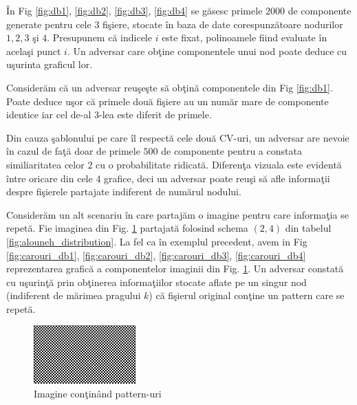 \documentclass{llncs}
\begin{document}
\^{I}n Fig {\ref{fig:db1}}, {\ref{fig:db2}}, {\ref{fig:db3}}, {\ref{fig:db4}} se g\u{a}sesc primele $2000$ de componente generate pentru cele $3$ fi\c{s}iere, stocate \^{i}n baza de date corespunz\u{a}toare nodurilor $1,2,3$ \c{s}i $4$. Presupunem c\u{a} indicele $i$ este fixat, polinoamele fiind evaluate \^{i}n acela\c{s}i punct $i$. Un adversar care ob\c{t}ine componentele unui nod poate deduce cu u\c{s}urinta graficul lor.

Consider\u{a}m c\u{a} un adversar reu\c{s}e\c{s}te s\u{a} ob\c{t}in\u{a} componentele din Fig {\ref{fig:db1}}. Poate deduce u\c{s}or c\u{a} primele dou\u{a} fi\c{s}iere au un num\u{a}r mare de componente identice iar cel de-al $3$-lea este diferit de primele.

Din cauza \c{s}ablonului pe care \^{i}l respect\u{a} cele dou\u{a} CV-uri, un adversar are nevoie \^{i}n cazul de fa\c{t}\u{a} doar de primele $500$ de componente pentru a constata similiaritatea celor $2$ cu o probabilitate ridicat\u{a}.
Diferen\c{t}a vizuala este evident\u{a} \^{i}ntre oricare din cele $4$ grafice, deci un adversar poate reu\c{s}i s\u{a} afle informa\c{t}ii despre fi\c{s}ierele partajate indiferent de num\u{a}rul nodului.

Consider\u{a}m un alt scenariu \^{i}n care partaj\u{a}m o imagine pentru care informa\c{t}ia se repet\u{a}. Fie imaginea din Fig. {\ref{fig:carouri}} partajat\u{a} folosind schema $(2,4)$ din tabelul {\ref{fig:alouneh_distribution}}. La fel ca \^{i}n exemplul precedent, avem in Fig {\ref{fig:carouri_db1}, \ref{fig:carouri_db2}, \ref{fig:carouri_db3}, \ref{fig:carouri_db4}} reprezentarea grafic\u{a} a componentelor imaginii din Fig. {\ref{fig:carouri}}. Un adversar constat\u{a} cu u\c{s}urin\c{t}\u{a} prin ob\c{t}inerea informa\c{t}iilor stocate aflate pe un singur nod (indiferent de m\u{a}rimea pragului $k$) c\u{a} fi\c{s}ierul original con\c{t}ine un pattern care se repet\u{a}.


\begin{figure}[H]
\begin{center}
\includegraphics[width=0.35\textwidth]{img/carouri.png}    %
\caption{Imagine con\c{t}in\^{a}nd pattern-uri} 
\label{fig:carouri}
\end{center}
\end{figure}
\end{document}
